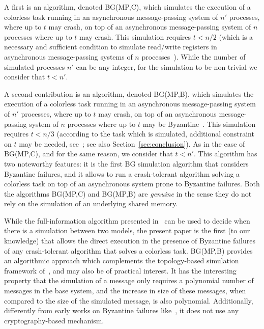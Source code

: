 \documentclass[11pt,letterpaper]{article}
\begin{document}
A first is an algorithm,  denoted BG(MP,C), which simulates the execution 
of a colorless task running in an asynchronous message-passing system of $n'$
processes, where up to $t$ may crash, on top of an  asynchronous
message-passing system of $n$  processes where up to $t$ may crash.
This simulation  requires $t<n/2$ (which is a necessary and sufficient
condition to  simulate read/write registers in asynchronous message-passing
systems of $n$ processes~\cite{ABD95}). While the number of simulated
processes $n'$ can be any integer, for the simulation to be non-trivial
we consider that $t<n'$.

A second contribution is an
algorithm, denoted BG(MP,B), which simulates the execution of a
colorless task running in an asynchronous message-passing system of $n'$
processes, where up to $t$ may crash, on top of an asynchronous message-passing 
system of $n$ processes where up to $t$ may be Byzantine~\cite{LSP82}.
This simulation requires $t<n/3$ (according to the task 
which is simulated, additional constraint on $t$ may be needed, 
see~\cite{HKR14}; see also Section~\ref{sec:conclusion}). 
As in the case of  BG(MP,C), and for the same reason, we consider that $t<n'$.
This algorithm has two noteworthy features: it is the first BG simulation
algorithm that considers Byzantine failures, and it allows to run a
crash-tolerant algorithm solving a colorless task on top of an asynchronous
system prone to Byzantine failures.
Both the algorithms BG(MP,C) and  BG(MP,B) are {\it genuine} in the 
sense they do not rely on the simulation of an underlying shared memory. 


While the  full-information algorithm presented
in~\cite{MTH14} can be used to decide when there is a simulation
between two models, the present paper is the first (to our knowledge)
that allows the direct execution in the presence of Byzantine failures
of any crash-tolerant algorithm that solves a colorless task.
BG(MP,B) provides an algorithmic approach which complements the
topology-based simulation framework of~\cite{MTH14}, and may also be
of practical interest.  It has the interesting property that the
simulation of a message only requires a polynomial number of messages
in the base system, and the increase in size of these messages, when
compared to the size of the simulated message, is also polynomial.
Additionally, differently from early works on Byzantine failures
like~\cite{GMW87}, it does not use any cryptography-based mechanism. 
\end{document}
